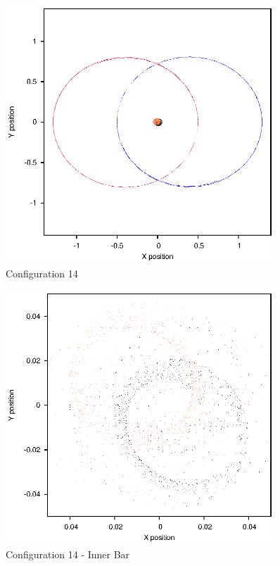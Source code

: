 \documentclass[a4paper,12pt]{article}
\begin{document}
\begin{figure}[H]
\centering
\includegraphics[width=0.9\textwidth]{./2017results/035-75-04-4/Orbit.eps}
\caption{Configuration 14}
\label{fig:config14}
\end{figure}
\begin{figure}[H]
\centering
\includegraphics[width=0.9\textwidth]{./2017results/035-75-04-4/Inner.eps}
\caption{Configuration 14 - Inner Bar}
\label{fig:config14i}
\end{figure}
\end{document}
